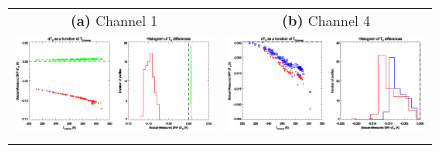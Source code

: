 \begin{figure}[htp]
  \centering
  \begin{tabular}{c c}
    \textsf{\textbf{(a)} Channel 1} &
    \textsf{\textbf{(b)} Channel 4} \\
    \includegraphics[bb=312 289 538 493,clip,scale=1.0]{graphics/dtb/atms_npp.ch1.TbStats.eps} &
    \includegraphics[bb=312 289 538 493,clip,scale=1.0]{graphics/dtb/atms_npp.ch4.TbStats.eps} \\\\


\end{tabular}
\end{figure}
